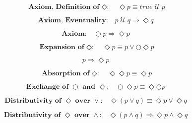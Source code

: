 \documentclass[fleqn, leqno]{article}
\newcommand{\until}{\;\mathcal{U}\;}
\newcommand{\next}{\bigcirc}
\newcommand{\event}{\Diamond}
\newcommand{\spacer}{\vspace{-30pt}}
\begin{document}
\spacer

\begin{equation}\label{E:defEvent}
\textbf{Axiom, Definition of $\event$:}\quad \event p \equiv true \until p
\end{equation}

\spacer

\begin{equation}\label{E:eventuality}
\textbf{Axiom, Eventuality:}\quad p \until q \Rightarrow \event q
\end{equation}

\spacer

\begin{equation}\label{E:nextEvent}
\textbf{Axiom:}\quad \next p \Rightarrow \event p
\end{equation}

\spacer

\begin{equation}\label{E:expansionEvent}
\textbf{Expansion of $\event$:}\quad \event p \equiv p \lor \next\event p
\end{equation}

\spacer

\begin{equation}\label{E:impEvent}
p \Rightarrow \event p
\end{equation}

\spacer

\begin{equation}\label{E:IdemEvent}
\textbf{Absorption of $\event$:}\quad \event\event p \equiv \event p
\end{equation}

\spacer

\begin{equation}\label{E:dNextEvent}
\textbf{Exchange of $\next$ and $\event$:}\quad \next\event p \equiv \event\next p
\end{equation}

\spacer

\begin{equation}\label{E:distEventOr}
\textbf{Distributivity of $\event$ over $\lor$:}\quad \event(p \lor q) \equiv \event p \lor \event q
\end{equation}

\spacer

\begin{equation}\label{E:distEventAnd}
\textbf{Distributivity of $\event$ over $\land$:}\quad \event(p \land q) \Rightarrow \event p \land \event q
\end{equation}
\end{document}

